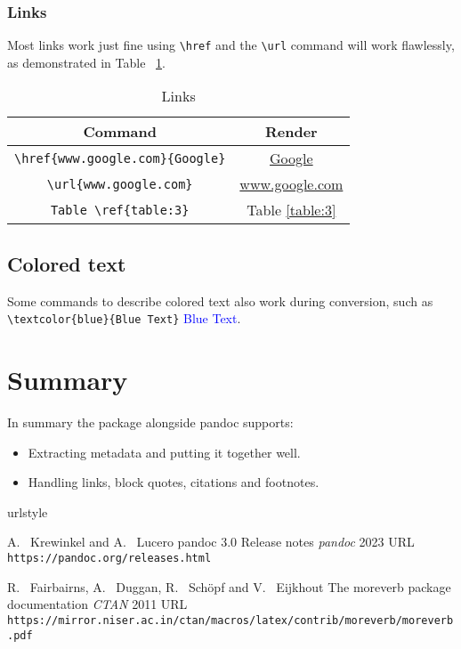 \subsubsection{Links}
Most links work just fine using \verb|\href| and the \verb|\url| command will work flawlessly, as demonstrated in Table ~\ref{table:4}.

\begin{table}[htbp]
\centering
\begin{tabular}{| c | c |}
 \hline
 Command & Render \\
 \hline
 \verb|\href{www.google.com}{Google}| & \href{www.google.com}{Google} \\ \hline
\verb|\url{www.google.com}| & \url{www.google.com}  \\ \hline
\verb|Table \ref{table:3}| & Table \ref{table:3}  \\ \hline
\end{tabular}
\caption{Links}
\label{table:4}
\end{table}

\subsection{Colored text}
Some commands to describe colored text also work during conversion, such as
\verb|\textcolor{blue}{Blue Text}|  \textcolor{blue}{Blue Text}.

\section{Summary}
In summary the  package alongside pandoc supports:
\begin{itemize}
\item Extracting metadata and putting it together well.
\item Handling links, block quotes, citations and footnotes.
\end{itemize}

\begin{thebibliography}{2}
    \providecommand{\natexlab}[1]{#1}
    \providecommand{\url}[1]{\texttt{#1}}
    \expandafter\ifx\csname urlstyle\endcsname\relax
      \providecommand{\doi}[1]{doi: #1}\else
      \providecommand{\doi}{doi: \begingroup \urlstyle{rm}\Url}\fi

A.~ Krewinkel and A.~ Lucero
\newblock pandoc 3.0 Release notes
\newblock \emph{pandoc}  2023
\newblock URL \url{https://pandoc.org/releases.html}

R.~ Fairbairns, A.~ Duggan, R.~ Schöpf and V.~ Eijkhout
\newblock The moreverb package documentation
\newblock \emph{CTAN}  2011
\newblock URL \url{https://mirror.niser.ac.in/ctan/macros/latex/contrib/moreverb/moreverb.pdf}

\end{thebibliography}


\address{%
Abhishek Ulayil\\
Institute of Actuaries of India (Student)\\%
Mumbai, India\\
ORCiD: 0009-0000-6935-8690\\
}

